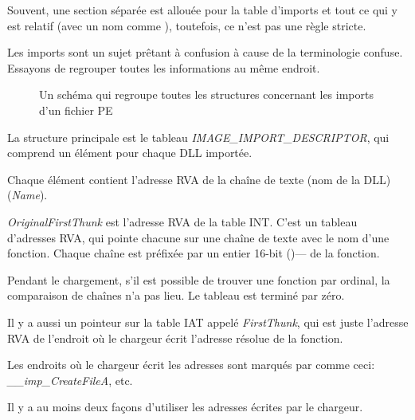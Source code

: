 
Souvent, une section séparée est allouée pour la table d'imports et tout ce qui y
est relatif (avec un nom comme ), toutefois, ce n'est pas une règle stricte.

Les imports sont un sujet prêtant à confusion à cause de la terminologie confuse.
Essayons de regrouper toutes les informations au même endroit.

\begin{figure}[H]
\centering
{}
\caption{
Un schéma qui regroupe toutes les structures concernant les imports d'un fichier PE}
\end{figure}

La structure principale est le tableau \emph{IMAGE\_IMPORT\_DESCRIPTOR}, qui comprend
un élément pour chaque DLL importée.

Chaque élément contient l'adresse \ac{RVA} de la chaîne de texte (nom de la DLL) (\emph{Name}).

\emph{OriginalFirstThunk} est l'adresse \ac{RVA} de la table \ac{INT}.
C'est un tableau d'adresses \ac{RVA}, qui pointe chacune sur une chaîne de texte
avec le nom d'une fonction.
Chaque chaîne est préfixée par un entier 16-bit ()--- de la fonction.

Pendant le chargement, s'il est possible de trouver une fonction par ordinal, la
comparaison de chaînes n'a pas lieu. Le tableau est terminé par zéro.

Il y a aussi un pointeur sur la table \ac{IAT} appelé \emph{FirstThunk}, qui est juste
l'adresse \ac{RVA} de l'endroit où le chargeur écrit l'adresse résolue de la fonction.

Les endroits où le chargeur écrit les adresses sont marqués par \IDA comme ceci:
\emph{\_\_imp\_CreateFileA}, etc.

Il y a au moins deux façons d'utiliser les adresses écrites par le chargeur.

